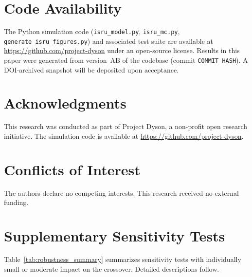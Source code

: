 \documentclass[preprint,12pt]{elsarticle}
\begin{document}
\section*{Code Availability}

The Python simulation code (\texttt{isru\_model.py}, \texttt{isru\_mc.py}, \texttt{generate\_isru\_figures.py}) and associated test suite are available at \url{https://github.com/project-dyson} under an open-source license. Results in this paper were generated from version~AB of the codebase (commit \texttt{COMMIT\_HASH}). A DOI-archived snapshot will be deposited upon acceptance.


\section*{Acknowledgments}

This research was conducted as part of Project Dyson, a non-profit open research initiative. The simulation code is available at \url{https://github.com/project-dyson}.

\section*{Conflicts of Interest}

The authors declare no competing interests. This research received no external funding.

\appendix
\section{Supplementary Sensitivity Tests}
\label{sec:appendix_sensitivity}

Table~\ref{tab:robustness_summary} summarizes sensitivity tests with individually small or moderate impact on the crossover. Detailed descriptions follow.
\end{document}
